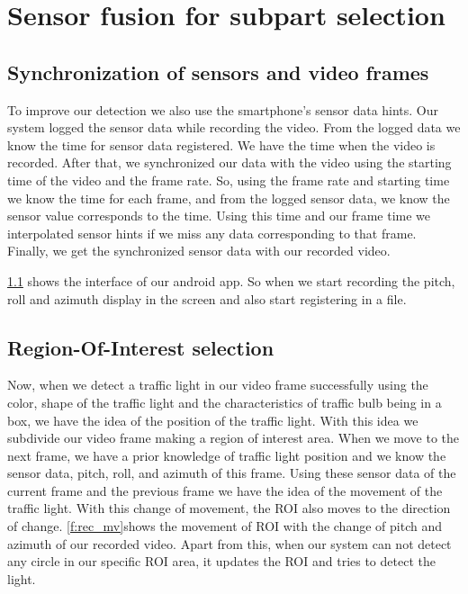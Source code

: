 \section{Sensor fusion for subpart selection}

\subsection{Synchronization of sensors and video frames}
To improve our detection we also use the smartphone's sensor data hints.
Our system logged the sensor data while recording the video.
From the logged data we know the time for sensor data registered.
We have the time when the video is recorded.
After that, we synchronized our data with the video using the starting time of the video and the frame rate.
So, using the frame rate and starting time we know the time for each frame, and from the logged sensor data, we know the sensor value corresponds to the time.
Using this time and our frame time we interpolated sensor hints if we miss any data corresponding to that frame.
Finally, we get the synchronized sensor data with our recorded video.

\ref{} shows the interface of our android app.
So when we start recording the pitch, roll and azimuth display in the screen and also start registering in a file.

\subsection{Region-Of-Interest selection}
\label{s:roi}
Now, when we detect a traffic light in our video frame successfully using the color, shape of the traffic light and the characteristics of traffic bulb being in a box, we have the idea of the position of the traffic light.
With this idea we subdivide our video frame making a region of interest area.
When we move to the next frame, we have a prior knowledge of traffic light position and we know the sensor data, pitch, roll, and azimuth of this frame.
Using these sensor data of the current frame and the previous frame we have the idea of the movement of the traffic light.
With this change of movement, the ROI also moves to the direction of change.
\ref{f:rec_mv}shows the movement of ROI with the change of pitch and azimuth of our recorded video.
Apart from this, when our system can not detect any circle in our specific ROI area, it updates the ROI and tries to detect the light.

